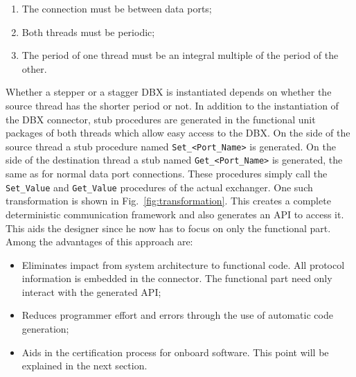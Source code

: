 \begin{enumerate}
\item{The connection must be between data ports;}
\item{Both threads must be periodic;}
\item{The period of one thread must be an integral multiple of the
  period of the other.}
\end{enumerate}

Whether a stepper or a stagger DBX is instantiated depends on whether
the source thread has the shorter period or not. In addition to the
instantiation of the DBX connector, stub procedures are generated in
the functional unit packages of both threads which allow easy access
to the DBX. On the side of the source thread a stub procedure named
\texttt{Set\_<Port\_Name>} is generated. On the side of the
destination thread a stub named \texttt{Get\_<Port\_Name>} is
generated, the same as for normal data port connections. These
procedures simply call the \texttt{Set\_Value} and \texttt{Get\_Value}
procedures of the actual exchanger. One such transformation is shown
in Fig.~\ref{fig:transformation}. This creates a complete
deterministic communication framework and also generates an API to
access it. This aids the designer since he now has to focus on only
the functional part. Among the advantages of this approach are:

\begin{itemize}
\item{Eliminates impact from system architecture to functional
  code. All protocol information is embedded in the connector. The
  functional part need only interact with the generated API;}
\item{Reduces programmer effort and errors through the use of
  automatic code generation;}
\item{Aids in the certification process for onboard software. This
  point will be explained in the next section.}
\end{itemize}

